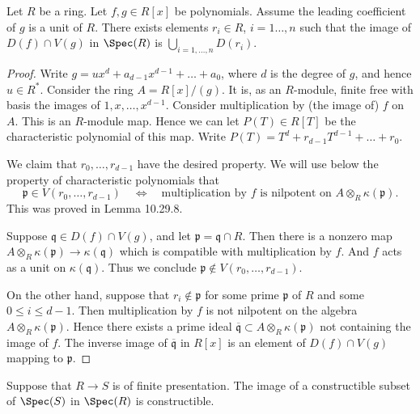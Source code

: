 \begin{lemma}[10.29.9]
Let $R$ be a ring. Let $f,g\in R[x]$ be polynomials. Assume the leading coefficient of $g$ is a unit of $R$. There exists elements $r_i\in R$, $i=1\ldots,n$ such that the image of $D(f)\cap V(g)$ in $\Spec(R)$ is $\bigcup_{i=1,\ldots,n}D(r_i)$.
\end{lemma}
\begin{proof}
Write $g=ux^d+a_{d-1}x^{d-1}+\ldots+a_0$, where $d$ is the degree of $g$, and hence $u\in R^*$. Consider the ring $A=R[x]/(g)$. It is, as an $R$-module, finite free with basis the images of $1,x,\ldots,x^{d-1}$. Consider multiplication by (the image of) $f$ on $A$. This is an $R$-module map. Hence we can let $P(T)\in R[T]$ be the characteristic polynomial of this map. Write $P(T)=T^d+r_{d-1}T^{d-1}+\ldots+r_0$.

We claim that $r_0,\ldots,r_{d-1}$ have the desired property. We will use below the property of characteristic polynomials that
\[
\mathfrak p\in V(r_0,\ldots,r_{d-1})\quad\Longleftrightarrow\quad
\text{multiplication by $f$ is nilpotent on }A\otimes_R\kappa(\mathfrak p).
\]
This was proved in Lemma 10.29.8.

Suppose $\mathfrak q\in D(f)\cap V(g)$, and let $\mathfrak p=\mathfrak q\cap R$. Then there is a nonzero map $A\otimes_R\kappa(\mathfrak p)\to\kappa(\mathfrak q)$ which is compatible with multiplication by $f$. And $f$ acts as a unit on $\kappa(\mathfrak q)$. Thus we conclude $\mathfrak p\notin V(r_0,\ldots,r_{d-1})$.

On the other hand, suppose that $r_i\notin\mathfrak p$ for some prime $\mathfrak p$ of $R$ and some $0\leq i\leq d-1$. Then multiplication by $f$ is not nilpotent on the algebra $A\otimes_R\kappa(\mathfrak p)$. Hence there exists a prime ideal $\overline{\mathfrak q}\subset A\otimes_R\kappa(\mathfrak p)$ not containing the image of $f$. The inverse image of $\overline{\mathfrak q}$ in $R[x]$ is an element of $D(f)\cap V(g)$ mapping to $\mathfrak p$.
\end{proof}
\begin{theorem}
Suppose that $R\to S$ is of finite presentation. The image of a constructible subset of $\Spec(S)$ in $\Spec(R)$ is constructible.
\end{theorem}
